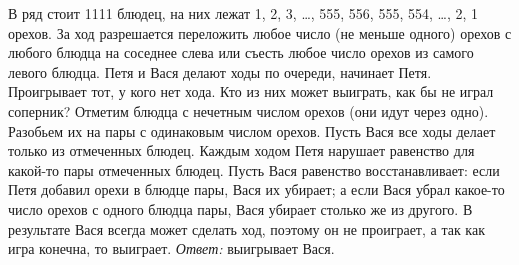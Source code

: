 \problem{}
В ряд стоит 1111 блюдец, на них лежат
1, 2, 3, \ldots, 555, 556, 555, 554, \ldots, 2, 1 орехов.
За ход разрешается переложить любое число (не меньше одного) орехов с любого
блюдца на соседнее слева или съесть любое число орехов из самого левого блюдца.
Петя и Вася делают ходы по очереди, начинает Петя.
Проигрывает тот, у кого нет хода.
Кто из них может выиграть, как бы не играл соперник?
\solution
Отметим блюдца с нечетным числом орехов (они идут через одно).
Разобьем их на пары с одинаковым числом орехов.
Пусть Вася все ходы делает только из отмеченных блюдец.
Каждым ходом Петя нарушает равенство для какой-то пары отмеченных блюдец.
Пусть Вася равенство восстанавливает:
если Петя добавил орехи в блюдце пары, Вася их убирает;
а если Вася убрал какое-то число орехов с одного блюдца пары, Вася убирает
столько же из другого.
В результате Вася всегда может сделать ход, поэтому он не проиграет,
а так как игра конечна, то выиграет.
\emph{Ответ:} выигрывает Вася.
\endproblem
